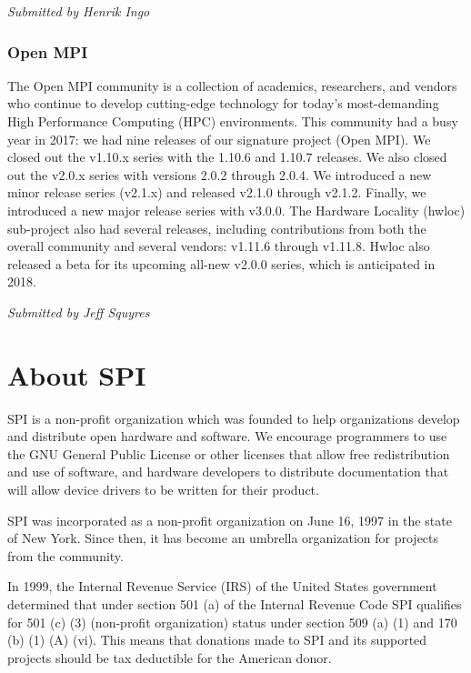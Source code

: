 \documentclass[a4paper]{report}
\begin{document}
{\em Submitted by Henrik Ingo}

\subsection{Open MPI}

The Open MPI community is a collection of academics, researchers, and
vendors who continue to develop cutting-edge technology for today's
most-demanding High Performance Computing (HPC) environments.  This
community had a busy year in 2017: we had nine releases of our signature
project (Open MPI).  We closed out the v1.10.x series with the 1.10.6
and 1.10.7 releases.  We also closed out the v2.0.x series with versions
2.0.2 through 2.0.4.  We introduced a new minor release series (v2.1.x)
and released v2.1.0 through v2.1.2.  Finally, we introduced a new major
release series with v3.0.0.  The Hardware Locality (hwloc) sub-project
also had several releases, including contributions from both the overall
community and several vendors: v1.11.6 through v1.11.8.  Hwloc also
released a beta for its upcoming all-new v2.0.0 series, which is
anticipated in 2018.

{\em Submitted by Jeff Squyres}

\appendix
\chapter{About SPI}

SPI is a non-profit organization which was founded to help organizations
develop and distribute open hardware and software. We encourage programmers
to use the GNU General Public License or other licenses that allow free
redistribution and use of software, and hardware developers to distribute
documentation that will allow device drivers to be written for their product.

SPI was incorporated as a non-profit organization on June 16, 1997 in the state
of New York. Since then, it has become an umbrella organization for projects
from the community.

In 1999, the Internal Revenue Service (IRS) of the United States government
determined that under section 501 (a) of the Internal Revenue Code SPI
qualifies for 501 (c) (3) (non-profit organization) status under section 509
(a) (1) and 170 (b) (1) (A) (vi). This means that donations made to SPI and its
supported projects should be tax deductible for the American donor.

\newpage

\pagestyle{empty}
\end{document}

